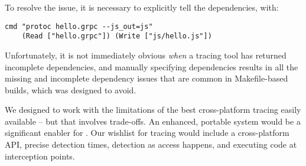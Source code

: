 To resolve the issue, it is necessary to explicitly tell \Rattle the dependencies, with:

\begin{verbatim}
cmd "protoc hello.grpc --js_out=js"
    (Read ["hello.grpc"]) (Write ["js/hello.js"])
\end{verbatim}

Unfortunately, it is not immediately obvious \emph{when} a tracing tool has returned incomplete dependencies, and manually specifying dependencies results in all the missing and incomplete dependency issues that are common in Makefile-based builds, which \Rattle was designed to avoid.


We designed \Rattle to work with the limitations of the best cross-platform tracing easily available -- but that involves trade-offs. An enhanced, portable system would be a significant enabler for \Rattle.
Our wishlist for tracing would include a cross-platform API, precise detection times, detection as access happens, and executing code at interception points.

